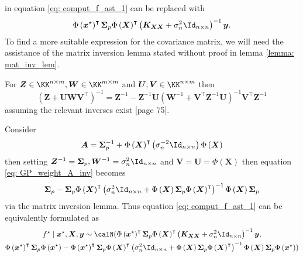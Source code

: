 in equation \ref{eq: comput_f_ast_1} can be replaced with
\[
    \Phi \left( \bm{x}^{\star} \right)^{\intercal} \bm{\Sigma}_p {\Phi \left( \bm{X} \right)}^{\intercal} \left( \bm{K}_{\bm{X} \bm{X}} + \sigma_n^{2} \Id_{n \times n} \right)^{-1} \bm{y}.
\]
To find a more suitable expression for the covariance matrix, we will need the assistance of the matrix inversion lemma stated without proof in lemma \ref{lemma: mat_inv_lem}.
\begin{lem} \label{lemma: mat_inv_lem}
    For $\bm{Z} \in \KK^{n \times m}, \bm{W} \in \KK^{m \times m}$ and $\bm{U},\bm{V} \in \KK^{n \times m}$ then
    \[
        \left( \bm{Z} + \bm{U} \bm{W} \bm{V}^{\intercal} \right)^{-1} = \bm{Z}^{-1} - \bm{Z}^{-1} \bm{U} \left( \bm{W}^{-1} + \bm{V}^{\intercal} \bm{Z}^{-1} \bm{U} \right)^{-1} \bm{V}^{\intercal} \bm{Z}^{-1}
    \]
    assuming the relevant inverses exist \cite{PressWilliamH.WilliamHenry1992NriC}[page 75].
\end{lem}
Consider
\begin{equation} \label{eq: GP_weight_A_inv}
    \bm{A} = \bm{\Sigma}_p^{-1} +  {\Phi \left( \bm{X} \right)}^{\intercal} \left( \sigma_n^{-2} \Id_{n \times n} \right) \Phi \left( \bm{X} \right)
\end{equation}
then setting $\bm{Z}^{-1} = \bm{\Sigma}_p, \bm{W}^{-1} = \sigma_n^{2} \Id_{n \times n}$ and $\bm{V} = \bm{U} = \Phi \left( \bm{X} \right)$ then equation \ref{eq: GP_weight_A_inv} becomes
\begin{equation*}
    \bm{\Sigma}_p - \bm{\Sigma}_p {\Phi \left( \bm{X} \right)}^{\intercal} \left( \sigma_n^{2} \Id_{n \times n} + \Phi \left( \bm{X} \right) \bm{\Sigma}_p {\Phi \left( \bm{X} \right)}^{\intercal} \right)^{-1} \Phi \left( \bm{X} \right) \bm{\Sigma}_p
\end{equation*}
via the matrix inversion lemma. Thus equation \ref{eq: comput_f_ast_1} can be equivalently formulated as
\begin{multline} \label{eq: comput_f_ast_2}
    f^{\star} \mid \bm{x}^{\star} , \bm{X} , \bm{y} \sim \calN ( \Phi \left( \bm{x}^{\star} \right)^{\intercal} \bm{\Sigma}_p {\Phi \left( \bm{X} \right)}^{\intercal} \left( \bm{K}_{\bm{X} \bm{X}} + \sigma_n^{2} \Id_{n \times n} \right)^{-1} \bm{y} , \\
    \Phi \left( \bm{x}^{\star} \right)^{\intercal} \bm{\Sigma}_p \Phi \left( \bm{x}^{\star} \right) - \Phi \left( \bm{x}^{\star} \right)^{\intercal} \bm{\Sigma}_p {\Phi \left( \bm{X} \right)}^{\intercal} \left( \sigma_n^{2} \Id_{n \times n} + \Phi \left( \bm{X} \right) \bm{\Sigma}_p {\Phi \left( \bm{X} \right)}^{\intercal} \right)^{-1} \Phi \left( \bm{X} \right) \bm{\Sigma}_p \Phi \left( \bm{x}^{\star} \right) )
\end{multline}
